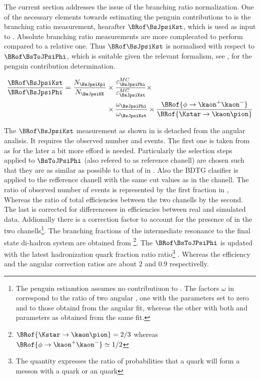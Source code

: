 
The current section addresses the issue of the branching ratio normalization.
One of the necessary elements towards estimating the penguin contributions to \phis is the \BsJpsiKst branching ratio measurement,
hearafter $\BRof\BsJpsiKst$, which is used as input to . Absolute branching ratio measurements are 
more complecated to perform compared to a relative one. Thus $\BRof\BsJpsiKst$ is normalised with respect to $\BRof\BsToJPsiPhi$,
which is suitable given the relevant formalism, see , for the penguin contribution determination. 

\begin{align}
\frac{\BRof\BsJpsiKst}{\BRof\BsJpsiPhi} = \frac{N_{\BsJpsiKpi}}{N_{\BsJpsiKK}} &\times \frac{\varepsilon_{\BsJpsiPhi}^{MC}}{\varepsilon_{\BsJpsiKst}^{MC}} \times \nonumber \\
                                                                          &\times \frac{\omega_{\BsJpsiPhi}}{\omega_{\BsJpsiKst}} \times \frac{\BRof{\phi\to\kaon^+\kaon^-}}{\BRof{\Kstar\to\kaon\pion}} 
\label{norm_jpsiPhi}
\end{align}

The $\BRof\BsJpsiKst$ measurement as shown in  is detached from the angular analisis. It requires the observed number 
\BsJpsiKst and \BsToJPsiPhi events. The first one is taken from  as for the later a bit more efford is needed.
Particularly the selection steps applied to $\BsToJPsiPhi$ (also refered to as reference chanell) are chosen such that they are as 
similar as possible to that of \BsJpsiKst in . Also the BDTG clasifier is applied to the refference chanell
with the same cut values as in the \BsJpsiKst chanell. The ratio of observed number of events is represented by the first fraction in ,
Whereas the ratio of total efficiencies between the two chanells by the second. The last is corrected for differenceses in efficiencies between real and 
simulated data. Addionally there is a correction factor to account for the presence of \swave in the two 
chanells\footnote{The penguin estiamtion assumes no \swave contributiuon to \BsJpsiKst. The factors $\omega$ in  correspond
to the ratio of two angular \pdfs, one with the \swave parameters set to zero and \pwave to those obtaind from the angular fit,  whereas the other
with both \pwave and \swave parameters as obtained from the same fit.
}. The branching fractions of the intermediate resonance to the final state di-hadron system are obtained from \cite{PDG}
\footnote{ $\BRof{\Kstar\to\kaon\pion} = 2/3$ whereas $\BRof{\phi\to\kaon^+\kaon^-}\simeq 1/2$}.
The $\BRof\BsToJPsiPhi$ \cite{SheldonKK} is updated with the latest hadronization \bquark quark fraction ratio  
ratio\footnote{The quantity \fdfs expresses the ratio of probabilities that a \bquark quark will form a messon with a \dquark quark or an \squark quark}
\cite{LHCb-CONF-2013-011}. Whereas the efficiency and the angular correction ratios are about $2$ and $0.9$ respectivelly. 

